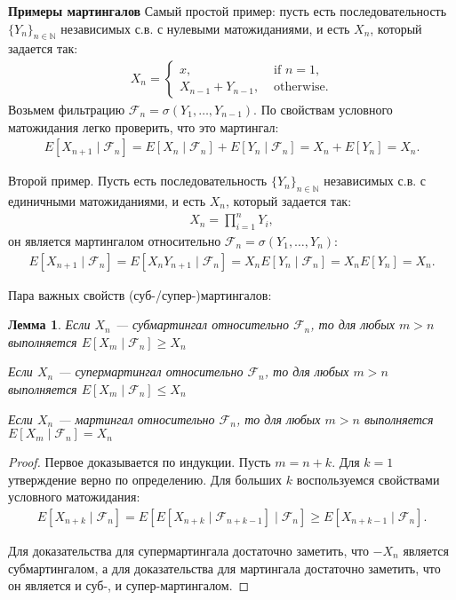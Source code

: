 \documentclass[12pt]{article}
\newcommand\N{\mathbb{N}}
\newcommand\F{\mathcal{F}}
\newtheorem{lemma}{Лемма}
\begin{document}
\textbf{Примеры мартингалов}
Самый простой пример: пусть есть последовательность $\{Y_n\}_{n \in \N}$ независимых с.в. с нулевыми матожиданиями, и есть $X_n$, который задается так:
\begin{align*}
  X_n = \begin{cases}
    x, &\text{ if } n = 1, \\
    X_{n - 1} + Y_{n - 1}, &\text{ otherwise.}
  \end{cases}
\end{align*} 
Возьмем фильтрацию $\F_n = \sigma(Y_1, \dots, Y_{n - 1})$. По свойствам условного матожидания легко проверить, что это мартингал:
\begin{align*}
  E[X_{n + 1} \mid \F_n] = E[X_n \mid \F_n] + E[Y_n \mid \F_n] = X_n + E[Y_n] = X_n.
\end{align*}

Второй пример. Пусть есть последовательность $\{Y_n\}_{n \in \N}$ независимых с.в. с единичными матожиданиями, и есть $X_n$, который задается так:
\begin{align*}
  X_n = \prod_{i = 1}^n Y_i,
\end{align*} 
он является мартингалом относительно $\F_n = \sigma(Y_1, \dots, Y_n)$:
\begin{align*}
  E[X_{n + 1} \mid \F_n] = E[X_n Y_{n + 1} \mid \F_n] = X_n E[Y_n \mid \F_n] = X_n E[Y_n] = X_n.
\end{align*}

Пара важных свойств (суб-/супер-)мартингалов:
\begin{lemma}
  Если $X_n$ --- субмартингал относительно $\F_n$, то для любых $m > n$ выполняется $E[X_m \mid \F_n] \ge X_n$

  Если $X_n$ --- супермартингал относительно $\F_n$, то для любых $m > n$ выполняется $E[X_m \mid \F_n] \le X_n$

  Если $X_n$ --- мартингал относительно $\F_n$, то для любых $m > n$ выполняется $E[X_m \mid \F_n] = X_n$
\end{lemma}

\begin{proof}
  Первое доказывается по индукции. Пусть $m = n + k$. Для $k = 1$ утверждение верно по определению. Для больших $k$ воспользуемся свойствами условного матожидания:
  \begin{align*}
    E[X_{n + k} \mid \F_n] = E[E[X_{n + k} \mid \F_{n + k - 1}] \mid \F_n] \ge E[X_{n + k - 1} \mid \F_n].
  \end{align*}

  Для доказательства для супермартингала достаточно заметить, что $-X_n$ является субмартингалом, а для доказательства для мартингала достаточно заметить, что он является и суб-, и супер-мартингалом.
\end{proof}
\end{document}
